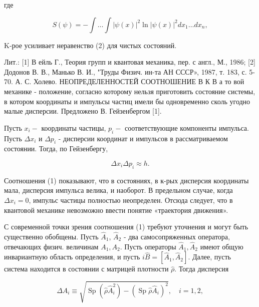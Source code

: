 \documentclass[10pt]{article}
\begin{document}
где



\[

S(\psi)=-\int \ldots \int|\psi(x)|^{2} \ln |\psi(x)|^{2} d x_{1} \ldots d x_{n},

\]



K-рое усиливает неравенство (2) для чистых состояний.



Лит.: [1] В ейль Г., Теория групп и квантовая механика, пер. с англ., М., 1986; [2] Додонов В. В., Манько В. И., "Труды Физич. ин-та АН СССР», 1987, т. 183, с. 5-70. А. С. Холево. НЕОПРЕДЕЛЕННОСТЕЙ СООТНОШЕНИЕ В К В а то вой механике - положение, согласно которому нельзя приготовить состояние системы, в котором координаты и импульсы частиц имели бы одновременно сколь угодно малые дисперсии. Предложено В. Гейзенбергом [1].



Пусть $x_{i}-$ координаты частицы, $p_{i}-$ соответствующие компоненты импульса. Пусть $\Delta x_{i}$ и $\Delta p_{i}$ - дисперсии координат и импульсов в рассматриваемом состоянии. Тогда, по Гейзенбергу,



\[

\Delta x_{i} \Delta p_{i} \approx h .

\]



Соотношения (1) показывают, что в состояниях, в к-рых дисперсия координаты мала, дисперсия импульса велика, и наоборот. В предельном случае, когда $\Delta x_{i}=0$, импульс частицы полностью неопределен. Отсюда следует, что в квантовой механике невозможно ввести понятие «траектория движения».



С современной точки зрения соотношения (1) требуют уточнения и могут быть существенно обобщены. Пусть $\hat{A}_{1}$, $\hat{A}_{2}$ - два самосопряженных оператора, отвечающих физич. величинам $A_{1}, A_{2}$. Пусть операторы $\hat{A}_{1}, \hat{A}_{2}$ имеют общую инвариантную область определения, и пусть $i \hat{B}=\left[\hat{A}_{1}, \hat{A}_{2}\right]$. Далее, пусть система находится в состоянии с матрицей плотности $\hat{\rho}$. Тогда дисперсия



\[

\Delta A_{i} \equiv \sqrt{\operatorname{Sp}\left(\hat{\rho} \hat{A}_{i}^{2}\right)-\left(\operatorname{Sp} \hat{\rho} \hat{A}_{i}\right)^{2}}, \quad i=1,2,

\]
\end{document}
